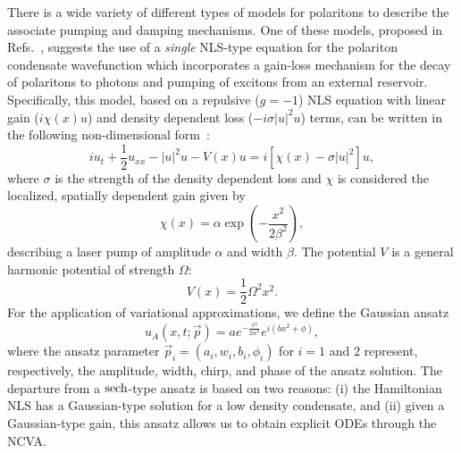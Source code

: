 {There is a wide variety of different types of models for polaritons to describe the associate pumping and damping mechanisms.  One of these models,
proposed in Refs.~\cite{Keeling2008,kbb,berl_review},
suggests the use of a {\em single} NLS-type equation for the polariton
condensate wavefunction which incorporates a gain-loss mechanism for the decay of polaritons to photons and pumping of excitons from an external reservoir.  Specifically, this model, based on a repulsive ($g=-1$)
NLS equation with linear gain ($i\chi(x) u$)
and density dependent loss ($-i\sigma |u|^2 u$) terms, can be written
in the following non-dimensional form~\cite{ref8,Keeling2008}:
%
\begin{equation}
iu_t + \frac{1}{2} u_{xx} - |u|^2 u - V(x)u =  i\left[\chi(x) - \sigma  |u|^2\right] u, \label{eq:NLSP}
\end{equation}
where $\sigma$ is the strength of the density dependent loss and $\chi$ is considered the localized, spatially dependent gain given by 
\begin{equation}
\chi(x) = \alpha\exp\left(-\frac{x^2}{2 \beta^2}\right),
\label{eq:gainP}
\end{equation}
describing a laser pump of amplitude $\alpha$ and width $\beta$.  The potential $V$ is a general harmonic potential of strength $\Omega$:
\begin{equation}
V(x) = \frac{1}{2} \Omega^2 x^2.
\label{eq:potP}
\end{equation}
For the application of variational approximations, we define the Gaussian ansatz 
\begin{equation}
u_A (x,t; \vec{p}) = a e^{ -\frac{x^2}{2w^2}}  e^{i\left(b x^2 + \phi\right)}, \label{eq:GaussAnsatz}
\end{equation}
where the ansatz parameter $\vec{p}_i = (a_i, w_i, b_i, \phi_i)$ for $i=1$ and 2
represent, respectively, the amplitude, width, chirp, and phase of the ansatz solution.  The departure from a ${\rm sech}$-type ansatz is based on two reasons: (i) the Hamiltonian NLS has a Gaussian-type solution for a low density condensate, and (ii) given a Gaussian-type gain, this ansatz allows us to obtain explicit ODEs through the NCVA.
%

}
